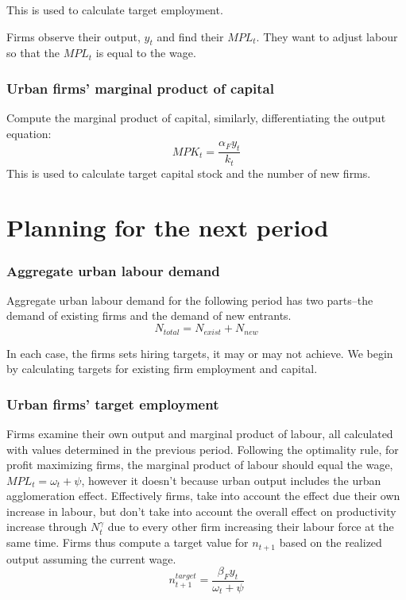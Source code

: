 This is used to calculate target employment.

Firms observe their output, ${y}_t$ and find their $MPL_t$. They want to adjust labour so that the $MPL_t$ is equal to the wage. 

\subsubsection{Urban firms' marginal product of capital} 
Compute the marginal product of capital, similarly, differentiating the output equation:
\begin{equation} MPK_t = \frac{\alpha_{F}{y}_{t}}{k_{t}} \label{eqn-urban-firm-mpk}
\end{equation} 
This is used to calculate target capital stock and the number of new firms.


\section{Planning for the next period}

\subsubsection{Aggregate urban labour demand} 
Aggregate urban labour demand for the following period has two parts--the demand of existing firms and the demand of new entrants. 
\begin{equation}
N_{total}= N_{exist}+N_{new}
\end{equation}


In each case, the firms sets hiring targets, it may or may not achieve. We begin by calculating targets for existing firm employment and capital. 

 
\subsubsection{Urban firms' target employment} 
Firms examine their own output and marginal product of labour, all calculated with values determined in the previous period. 
Following the  optimality rule, for profit maximizing firms, the marginal product of labour should equal the wage, $MPL_t= {\omega_t + \psi}$, however it doesn't because urban output includes the urban agglomeration effect. Effectively firms, take into account the effect due their own increase in labour, but don't take into account the overall effect on  productivity increase through $N_t^\gamma$ due to every other firm increasing their labour force at the same time. Firms thus compute a target value for $n_{t+1}$ based on the realized output assuming the current wage. %
\begin{equation} n^{target}_{t+1}= \frac{\beta_F {y}_{t}}{\omega_t + \psi} \label{eqn-urban-firm-target}
\end{equation}


